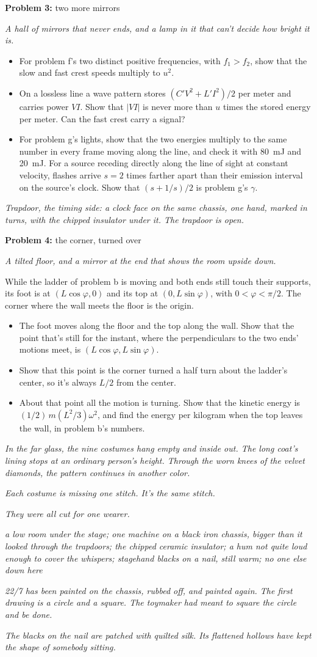 \documentclass[11pt]{article}
\newcommand{\scene}[1]{\par{\itshape #1}\par}
\newcommand{\problem}[2]{\par\medskip\textbf{Problem #1:} #2\par\nopagebreak}
\newcommand{\appx}[2]{\clearpage{\Large\bfseries Appendix #1: #2}\par\medskip}
\newenvironment{parts}{\begin{itemize}[leftmargin=3.4em,labelwidth=2.8em,labelsep=0.6em,align=left,itemsep=2pt,topsep=3pt]}{\end{itemize}}
\newcommand{\pt}[1]{\item[\textbf{#1}]}
\begin{document}
\problem{3}{two more mirrors}
\scene{A hall of mirrors that never ends, and a lamp in it that can't decide how bright it is.}
\begin{parts}
\pt{3-$\alpha$} For problem f's two distinct positive frequencies, with $f_1 > f_2$, show that the slow and fast crest speeds multiply to $u^2$.
\pt{3-$\beta$} On a lossless line a wave pattern stores $(C'V^2 + L'I^2)/2$ per meter and carries power $VI$. Show that $|VI|$ is never more than $u$ times the stored energy per meter. Can the fast crest carry a signal?
\pt{3-$\gamma$} For problem g's lights, show that the two energies multiply to the same number in every frame moving along the line, and check it with \SI{80}{mJ} and \SI{20}{mJ}. For a source receding directly along the line of sight at constant velocity, flashes arrive $s = 2$ times farther apart than their emission interval on the source's clock. Show that $(s + 1/s)/2$ is problem g's $\gamma$.
\end{parts}
\scene{Trapdoor, the timing side: a clock face on the same chassis, one hand, marked in turns, with the chipped insulator under it. The trapdoor is open.}

\problem{4}{the corner, turned over}
\scene{A tilted floor, and a mirror at the end that shows the room upside down.}
While the ladder of problem b is moving and both ends still touch their supports, its foot is at $(L\cos\varphi, 0)$ and its top at $(0, L\sin\varphi)$, with $0 < \varphi < \pi/2$. The corner where the wall meets the floor is the origin.
\begin{parts}
\pt{4-$\alpha$} The foot moves along the floor and the top along the wall. Show that the point that's still for the instant, where the perpendiculars to the two ends' motions meet, is $(L\cos\varphi, L\sin\varphi)$.
\pt{4-$\beta$} Show that this point is the corner turned a half turn about the ladder's center, so it's always $L/2$ from the center.
\pt{4-$\gamma$} About that point all the motion is turning. Show that the kinetic energy is $(1/2)\,m(L^2/3)\omega^2$, and find the energy per kilogram when the top leaves the wall, in problem b's numbers.
\end{parts}
\scene{In the far glass, the nine costumes hang empty and inside out. The long coat's lining stops at an ordinary person's height. Through the worn knees of the velvet diamonds, the pattern continues in another color.}
\scene{Each costume is missing one stitch. It's the same stitch.}
\scene{They were all cut for one wearer.}

\appx{$\gamma$}{under the stage}
\scene{a low room under the stage; one machine on a black iron chassis, bigger than it looked through the trapdoors; the chipped ceramic insulator; a hum not quite loud enough to cover the whispers; stagehand blacks on a nail, still warm; no one else down here}
\scene{22/7 has been painted on the chassis, rubbed off, and painted again. The first drawing is a circle and a square. The toymaker had meant to square the circle and be done.}
\scene{The blacks on the nail are patched with quilted silk. Its flattened hollows have kept the shape of somebody sitting.}
\end{document}
